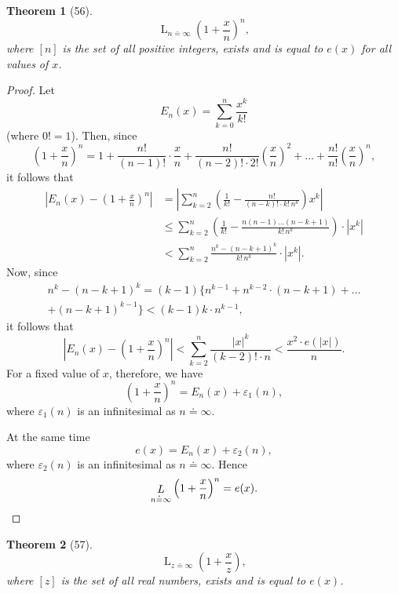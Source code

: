 \documentclass[a4paper,12pt]{book}[2004/02/16]
\providecommand{\leqq}{\leq}
\providecommand{\hypertarget}[2]{#2}
\theoremstyle{ilemma}
\theoremstyle{itheorem}
\newtheorem{theorem}{Theorem}
\theoremstyle{iother}
\theoremstyle{icorollary}
\theoremstyle{numcorollary}
\theoremstyle{idefinition}
\begin{document}
\begin{theorem}[56]\hypertarget{thm56}{}
\[
  \mathop{L}_{n\doteq\infty} \left(1+\frac xn\right)^n,
\]
where $[n]$ is the set of all positive integers, exists and is equal
to $e(x)$ for all values of $x$.
\end{theorem}
\begin{proof}
Let
\[
E_n(x) = \sum_{k=0}^n\frac{x^k}{k!}
\]
(where $0! = 1$).
Then, since
\[
  \left(1+\frac xn\right)^n
  = 1 + \frac{n!}{(n-1)!} \cdot\frac xn
    + \frac{n!}{(n-2)!\cdot 2!} \left(\frac xn\right)^2 + \ldots
    + \frac{n!}{n!} \left(\frac xn\right)^n,
\]
it follows that
\begin{align*}
  \left|E_n(x)-\left(1+\frac xn\right)^n\right|
  &= \left|\sum_{k=2}^n\left(\frac1{k!}-
  \frac{n!}{(n-k)!\cdot k!\,n^k} \right)x^k\right|
\\
  &\leqq \sum_{k=2}^n\left(\frac1{k!}-
  \frac{n(n-1)\ldots(n-k+1)}{k!\,n^k} \right)\cdot|x^k|
\\
  &<\sum_{k=2}^n \frac{n^k-(n-k+1)^k}{k!\,n^k}\cdot|x^k|.
\end{align*}
Now, since
\begin{multline*}
  n^k-(n-k+1)^k = (k-1)\{n^{k-1}+n^{k-2}\cdot(n-k+1)+\ldots
\\
  +(n-k+1)^{k-1}\} < (k-1)k\cdot n^{k-1},
\end{multline*}
it follows that
\[
  \left|E_n(x)-\left(1+\frac xn\right)^n\right|
  < \sum_{k=2}^n \frac{|x|^k}{(k-2)!\cdot n}
  < \frac{x^2\cdot e(|x|)}{n}.
\]
For a fixed value of $x$, therefore, we have
\[
  \left(1+\frac xn\right)^n = E_n(x)+\varepsilon_1(n),
\]
where $\varepsilon_1(n)$ is an infinitesimal as $n\doteq\infty$.

At the same time
\[
  e(x) = E_n(x) + \varepsilon_2(n),
\]
where $\varepsilon_2(n)$ is an infinitesimal as $n\doteq\infty$.
Hence
\[
  \mathop{L}_{n\doteq\infty} \left(1+\frac xn\right)^n = e(x).\qedhere
\]
\end{proof}
\begin{theorem}[57]\hypertarget{thm57}{}
\[
 \mathop{L}_{z\doteq \infty} \left(1+\frac xz\right),
\]
where $[z]$ is the set of all real numbers, exists and is equal to
$e(x)$.
\end{theorem}
\end{document}
